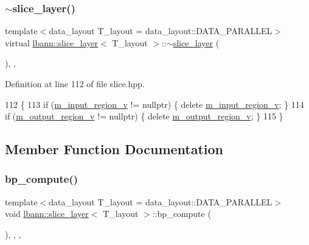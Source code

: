 \subsubsection{\texorpdfstring{$\sim$slice\+\_\+layer()}{~slice\_layer()}}
{\footnotesize\ttfamily template$<$data\+\_\+layout T\+\_\+layout = data\+\_\+layout\+::\+D\+A\+T\+A\+\_\+\+P\+A\+R\+A\+L\+L\+EL$>$ \\
virtual \hyperlink{classlbann_1_1slice__layer}{lbann\+::slice\+\_\+layer}$<$ T\+\_\+layout $>$\+::$\sim$\hyperlink{classlbann_1_1slice__layer}{slice\+\_\+layer} (\begin{DoxyParamCaption}{ }\end{DoxyParamCaption})\hspace{0.3cm}{\ttfamily [inline]}, {\ttfamily [override]}, {\ttfamily [virtual]}}



Definition at line 112 of file slice.\+hpp.


\begin{DoxyCode}
112                                   \{
113     \textcolor{keywordflow}{if} (\hyperlink{classlbann_1_1slice__layer_a3e64f86a9e999d3d72867c6009aa99ba}{m\_input\_region\_v} != \textcolor{keyword}{nullptr})  \{ \textcolor{keyword}{delete} \hyperlink{classlbann_1_1slice__layer_a3e64f86a9e999d3d72867c6009aa99ba}{m\_input\_region\_v}; \}
114     \textcolor{keywordflow}{if} (\hyperlink{classlbann_1_1slice__layer_a9d72208fc8136641e91cb208c38f8b65}{m\_output\_region\_v} != \textcolor{keyword}{nullptr}) \{ \textcolor{keyword}{delete} 
      \hyperlink{classlbann_1_1slice__layer_a9d72208fc8136641e91cb208c38f8b65}{m\_output\_region\_v}; \}
115   \}
\end{DoxyCode}


\subsection{Member Function Documentation}
\mbox{\label{classlbann_1_1slice__layer_a080654076a1b266b2c6d229e9fccf250}} 
\subsubsection{\texorpdfstring{bp\+\_\+compute()}{bp\_compute()}}
{\footnotesize\ttfamily template$<$data\+\_\+layout T\+\_\+layout = data\+\_\+layout\+::\+D\+A\+T\+A\+\_\+\+P\+A\+R\+A\+L\+L\+EL$>$ \\
void \hyperlink{classlbann_1_1slice__layer}{lbann\+::slice\+\_\+layer}$<$ T\+\_\+layout $>$\+::bp\+\_\+compute (\begin{DoxyParamCaption}{ }\end{DoxyParamCaption})\hspace{0.3cm}{\ttfamily [inline]}, {\ttfamily [override]}, {\ttfamily [protected]}, {\ttfamily [virtual]}}


